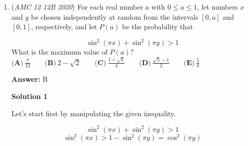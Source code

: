 \begin{enumerate}
 We now have almost represented $96$ as $f_1 \bullet f_2 \bullet f_3\cdots f_k$, except we need to incorporate the 3 factor.  We can either multiply $3$ with one of the powers of $2$ in between the adjacent '$\bullet$'s, or place $3$ in the spaces between/beyond the powers (so that we have a single $3$ in the product).  

 We first take the case where we multiply on of the powers of $2$ by $3$. We see that since each placement of powers of $2$ has one more power than it does '$\bullet$'s, and since we have $4$ '$\bullet$'s in each pair of placements, there must be $4+2=6$ powers of $2$ in between adjacent '$\bullet$'s.  We can multiply our factor of $3$ by any of the $6$ powers in the pair, each different power that we multiply by giving us $1$ unique solution.  Thus, we have $6$ unique solutions that come from each pair when we multiply by $3$.

 Secondly, we can include $3$ on its own, in between its own set of '$\bullet$'.  We can put the $3$ anywhere in between the powers of $2$ or at either end of the permutation.  There are $4$ places between the powers of $2$ in any pair (equal to the number of '$\bullet$'s) and $4$ places at the end of the equations, giving us $4+4=8$ more solutions.

 We have $6+8=14$ ways of decomposing $96$ from one pair, and we have $8$ pairs.  The answer is then $8\cdot 14=112$.

 


 


 


	\item (\textit{AMC 12 12B 2020}) For each real number $a$ with $0 \leq a \leq 1$, let numbers $x$ and $y$ be chosen independently at random from the intervals $[0, a]$ and $[0, 1]$, respectively, and let $P(a)$ be the probability that


 
 \[\sin^2{(\pi x)} + \sin^2{(\pi y)} > 1\]
What is the maximum value of $P(a)?$
$\textbf{(A)}\ \frac{7}{12} \qquad\textbf{(B)}\ 2 - \sqrt{2} \qquad\textbf{(C)}\ \frac{1+\sqrt{2}}{4} \qquad\textbf{(D)}\ \frac{\sqrt{5}-1}{2} \qquad\textbf{(E)}\ \frac{5}{8}$

 \textbf{Answer: }B



\textbf{Solution 1}

Let's start first by manipulating the given inequality.

 
 \[\sin^{2}{(\pi x)}+\sin^{2}{(\pi y)}>1\]
 \[\sin^{2}{(\pi x)}>1-\sin^{2}{(\pi y)}=\cos^{2}{(\pi y)}\]


\end{enumerate}
